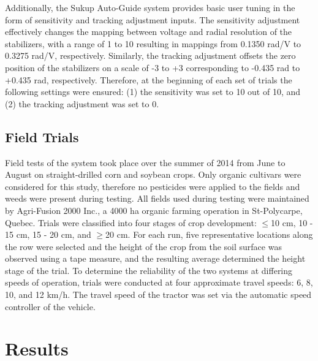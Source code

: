 Additionally, the Sukup Auto-Guide system provides basic user tuning
in the form of sensitivity and tracking adjustment inputs. The
sensitivity adjustment effectively changes the mapping between voltage
and radial resolution of the stabilizers, with a range of 1 to 10
resulting in mappings from 0.1350 rad/V to 0.3275 rad/V,
respectively. Similarly, the tracking adjustment offsets the zero
position of the stabilizers on a scale of -3 to +3 corresponding to
-0.435 rad to +0.435 rad, respectively. Therefore, at the beginning of
each set of trials the following settings were ensured: (1) the
sensitivity was set to 10 out of 10, and (2) the tracking adjustment
was set to 0.

\subsection{Field Trials}
Field tests of the system took place over the summer of 2014 from June
to August on straight-drilled corn and soybean crops. Only organic
cultivars were considered for this study, therefore no pesticides were
applied to the fields and weeds were present during testing. All
fields used during testing were maintained by Agri-Fusion 2000 Inc., a
4000 ha organic farming operation in St-Polycarpe, Quebec. Trials were
classified into four stages of crop development: $\le$10 cm, 10 - 15
cm, 15 - 20 cm, and $\ge$20 cm. For each run, five representative
locations along the row were selected and the height of the crop from
the soil surface was observed using a tape measure, and the resulting
average determined the height stage of the trial. To determine the
reliability of the two systems at differing speeds of operation,
trials were conducted at four approximate travel speeds: 6, 8, 10, and
12 km/h. The travel speed of the tractor was set via the automatic
speed controller of the vehicle.

\section{Results}
\begin{table}[h]
  \centering
  \caption{RMSE and 95$^{th}$ Percentile
    with respect to crop-stage.} 
  \label{table:travel_speed}
\end{table}

